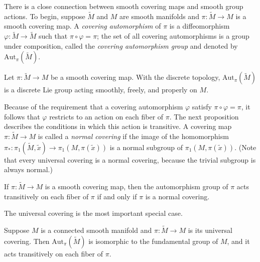 There is a close connection between smooth covering maps and smooth group actions. To begin, suppose $\tilde{M}$ and $M$ are smooth manifolds and $\pi: \tilde{M} \to M$ is a smooth covering map. A \emph{covering automorphism} of $\pi$ is a diffeomorphism $\varphi: \widetilde{M} \to \widetilde{M}$ such that $\pi \circ \varphi = \pi$; the set of all covering automorphisms is a group under composition, called the \emph{covering automorphism group} and denoted by $\mathrm{Aut}_\pi(\widetilde{M})$.

\begin{proposition}\label{prop:covering-automorphisms-discrete-lie-group}
Let $\pi: \widetilde{M} \to M$ be a smooth covering map. With the discrete topology, $\mathrm{Aut}_\pi(\widetilde{M})$ is a discrete Lie group acting smoothly, freely, and properly on $M$.
\end{proposition}

Because of the requirement that a covering automorphism $\varphi$ satisfy $\pi \circ \varphi = \pi$, it follows that $\varphi$ restricts to an action on each fiber of $\pi$. The next proposition describes the conditions in which this action is transitive. A covering map $\pi: \widetilde{M} \to M$ is called a \emph{normal covering} if the image of the homomorphism $\pi_*: \pi_1(\widetilde{M}, \widetilde{x}) \to \pi_1(M, \pi(\widetilde{x}))$ is a normal subgroup of $\pi_1(M, \pi(\widetilde{x}))$. (Note that every universal covering is a normal covering, because the trivial subgroup is always normal.)

\begin{proposition}\label{prop:normal-covering-transitive-action}
If $\pi: \widetilde{M} \to M$ is a smooth covering map, then the automorphism group of $\pi$ acts transitively on each fiber of $\pi$ if and only if $\pi$ is a normal covering.
\end{proposition}

The universal covering is the most important special case.

\begin{proposition}\label{prop:automorphisms-universal-covering}
Suppose $M$ is a connected smooth manifold and $\pi: \widetilde{M} \to M$ is its universal covering. Then $\mathrm{Aut}_\pi(\widetilde{M})$ is isomorphic to the fundamental group of $M$, and it acts transitively on each fiber of $\pi$.
\end{proposition}

